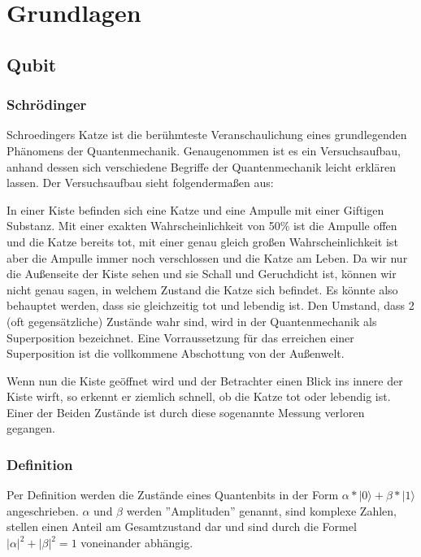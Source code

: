 
\section{Grundlagen}
\label{sec:grundlagen}

\subsection{Qubit}
\label{sec:qubit}

\subsubsection{Schrödinger}
\label{sec:schrodinger}

Schroedingers Katze ist die berühmteste Veranschaulichung eines grundlegenden Phänomens der Quantenmechanik. Genaugenommen ist es ein Versuchsaufbau, anhand dessen sich verschiedene Begriffe der Quantenmechanik leicht erklären lassen. Der Versuchsaufbau sieht folgendermaßen aus:

In einer Kiste befinden sich eine Katze und eine Ampulle mit einer Giftigen Substanz. Mit einer exakten Wahrscheinlichkeit von 50\% ist die Ampulle offen und die Katze bereits tot, mit einer genau gleich großen Wahrscheinlichkeit ist aber die Ampulle immer noch verschlossen und die Katze am Leben. Da wir nur die Außenseite der Kiste sehen und sie Schall und Geruchdicht ist, können wir nicht genau sagen, in welchem Zustand die Katze sich befindet. Es könnte also behauptet werden, dass sie gleichzeitig tot und lebendig ist.
Den Umstand, dass 2 (oft gegensätzliche) Zustände wahr sind, wird in der Quantenmechanik als Superposition bezeichnet. Eine Vorraussetzung für das erreichen einer Superposition ist die vollkommene Abschottung von der Außenwelt. 

Wenn nun die Kiste geöffnet wird und der Betrachter einen Blick ins innere der Kiste wirft, so erkennt er ziemlich schnell, ob die Katze tot oder lebendig ist. Einer der Beiden Zustände ist durch diese sogenannte Messung verloren gegangen.

\subsubsection{Definition}
\label{sec:bit_definition}

Per Definition werden die Zustände eines Quantenbits in der Form $\alpha * |0\rangle + \beta * |1\rangle$ angeschrieben.
$\alpha$ und $\beta$ werden ''Amplituden'' genannt, sind komplexe Zahlen, stellen einen Anteil am Gesamtzustand dar und sind durch die Formel $|\alpha|^2 + |\beta|^2 = 1$ voneinander abhängig.

